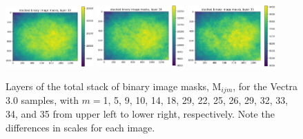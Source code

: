 \documentclass[letterpaper,11pt]{article}
\newcommand{\Mu}{\mathrm{M}}
\begin{document}
\begin{figure}[!ht]
\includegraphics[width=0.3\textwidth]{images/measuring_flatfield_corrections/mask_stack_layers_vectra/mask_stack_layer_33}
\includegraphics[width=0.3\textwidth]{images/measuring_flatfield_corrections/mask_stack_layers_vectra/mask_stack_layer_34}
\includegraphics[width=0.3\textwidth]{images/measuring_flatfield_corrections/mask_stack_layers_vectra/mask_stack_layer_35}
\caption{\footnotesize Layers of the total stack of binary image masks, $\Mu_{ijm}$, for the Vectra 3.0 samples, with $m=$1, 5, 9, 10, 14, 18, 29, 22, 25, 26, 29, 32, 33, 34, and 35 from upper left to lower right, respectively. Note the differences in scales for each image.}
\label{fig:mask_stack_layers_vectra}
\end{figure}
\end{document}
